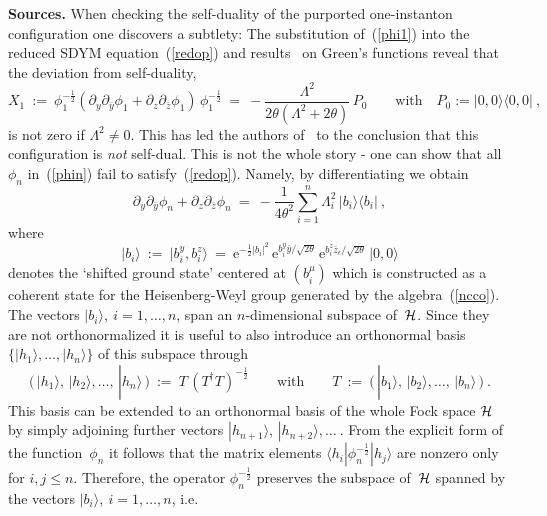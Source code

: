 \documentclass[a4paper,11pt]{article}
\numberwithin{equation}{section}
\def\eps{\epsilon}
\def\th{\theta}
\newcommand{\Hcal}{{\cal H}}
\def\e{\mbox{e}}
\def\pa{\mbox{$\partial$}}
\def\>{\rangle}
\def\<{\langle}
\def\+{\dagger}
\begin{document}
{\noindent
{\bf Sources.}
When checking the self-duality of the purported one-instanton configuration
one discovers a subtlety:
The substitution of~(\ref{phi1}) into the reduced SDYM equation~(\ref{redop}) 
and results~\cite{Gross:2000wc} on Green's functions reveal 
that the deviation from self-duality, 
\begin{equation}\label{ex}
X_1\ :=\ \phi^{-\frac12}_1
(\pa_y\pa_{\bar y}\phi_1 + \pa_z\pa_{\bar z}\phi_1 )\,\phi^{-\frac12}_1\
=\ -\frac{\Lambda^2}{2\th (\Lambda^2 +2\th )}\,P_0
\qquad \mbox{with}\quad P_0:=|0,0\>\<0,0| \ ,
\end{equation}
is not zero if $\Lambda^2{\neq}0$.  
This has led the authors of~\cite{Correa:2001wv} 
to the conclusion that this configuration is {\it not\/} self-dual. 
This is not the whole story - one can 
show that all $\phi_n$ in~(\ref{phin}) fail to satisfy~(\ref{redop}).
Namely, by differentiating we obtain
\begin{equation}\label{ddphin}
\pa_y\pa_{\bar y}\phi_n+\pa_z\pa_{\bar z}\phi_n\ =\ -\frac{1}{4\th^2}
\sum_{i=1}^n \Lambda^2_i\, |b_i\>\<b_i|\ ,
\end{equation}
where
\begin{equation} \label{bstates}
|b_i\>\ :=\ |b_i^y, b_i^z\>\ =\ \e^{-\frac{1}{2}|b_i|^2}\, 
\e^{b_i^y\bar y/\sqrt{2\th}}\,\e^{b_i^z \bar z_\eps/\sqrt{2\th}}\, |0,0\>
\end{equation}
denotes the `shifted ground state' centered at $(b_i^\mu)$ which is
constructed as a coherent state for the Heisenberg-Weyl group
generated by the algebra~(\ref{ncco}).  The vectors $|b_i\>,\ i=1,\ldots,n$, 
span an $n$-dimensional subspace of~$\Hcal$. Since they are not orthonormalized
it is useful to also introduce an orthonormal basis $\{|h_1\>,\ldots,|h_n\>\}$ 
of this subspace through~\cite{Rocek}
\begin{equation}
\bigl(\,|h_1\>,\,|h_2\>,\ldots,\,|h_n\>\,\bigr)\ :=\ T\,(T^\+ T)^{-\frac12}
\qquad\textrm{with}\qquad
T\ :=\ \bigl(\,|b_1\>,\,|b_2\>,\ldots,\,|b_n\>\,\bigr) \ .
\end{equation}
This basis can be extended to an orthonormal basis of the whole Fock space
$\Hcal$ by simply adjoining further vectors $|h_{n+1}\>,\,|h_{n+2}\>,\ldots\ $.
{}From the explicit form of the function~$\phi_n$ it follows that the
matrix elements $\<h_i|\phi^{-\frac{1}{2}}_n|h_j\>$ 
are nonzero only for $i,j\le n$.
Therefore, the operator $\phi^{-\frac{1}{2}}_n$ preserves 
the subspace of~$\Hcal$ spanned by the vectors $|b_i\>,\ i=1,\ldots,n$, i.e.
\begin{equation}

\end{equation}}
\end{document}
